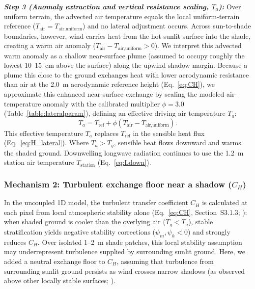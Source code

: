 \documentclass[12pt]{article}
\begin{document}
\vspace{0.6ex}
\noindent\textbf{\textit{Step 3 (Anomaly extraction and vertical resistance scaling, $T_a$):}}
Over uniform terrain, the advected air temperature equals the local uniform-terrain reference ($T_{\textrm{air}} = T_{\textrm{air,uniform}}$) and no lateral adjustment occurs. Across sun-to-shade boundaries, however, wind carries heat from the hot sunlit surface into the shade, creating a warm air anomaly ($T_{\textrm{air}} - T_{\textrm{air,uniform}} > 0$). We interpret this advected warm anomaly as a shallow near-surface plume (assumed to occupy roughly the lowest $10\text{--}15$~cm above the surface) along the upwind shadow margin. Because a plume this close to the ground exchanges heat with lower aerodynamic resistance than air at the 2.0~m aerodynamic reference height (Eq.~\ref{eq:CH}), we approximate this enhanced near-surface exchange by scaling the modeled air-temperature anomaly with the calibrated multiplier $\phi = 3.0$ (Table~\ref{table:lateralparam}), defining an effective driving air temperature $T_a$:
\begin{equation} \label{eq:anomaly}
T_a = T_{\textrm{ref}} + \phi \left( T_{\textrm{air}} - T_{\textrm{air,uniform}} \right)\textrm{.}
\end{equation}
\noindent This effective temperature $T_a$ replaces $T_{\textrm{ref}}$ in the sensible heat flux (Eq.~\ref{eq:H_lateral}). Where $T_a > T_g$, sensible heat flows downward and warms the shaded ground. Downwelling longwave radiation continues to use the 1.2~m station air temperature $T_{\textrm{station}}$ (Eq.~\ref{eq:Ldown}).

\subsubsection{Mechanism 2: Turbulent exchange floor near a shadow (\texorpdfstring{$C_H$}{CH})}

\noindent In the uncoupled 1D model, the turbulent transfer coefficient $C_H$ is calculated at each pixel from local atmospheric stability alone (Eq.~\ref{eq:CH}, Section~S3.1.3; \citealt{Itzkovitch2025}): when shaded ground is cooler than the overlying air ($T_g < T_a$), stable stratification yields negative stability corrections ($\psi_m, \psi_h < 0$) and strongly reduces $C_H$. Over isolated 1--2~m shade patches, this local stability assumption may underrepresent turbulence supplied by surrounding sunlit ground. Here, we added a neutral exchange floor to $C_H$, assuming that turbulence from surrounding sunlit ground persists as wind crosses narrow shadows (as observed above other locally stable surfaces; \citealt{helgason_2012}).
\end{document}

